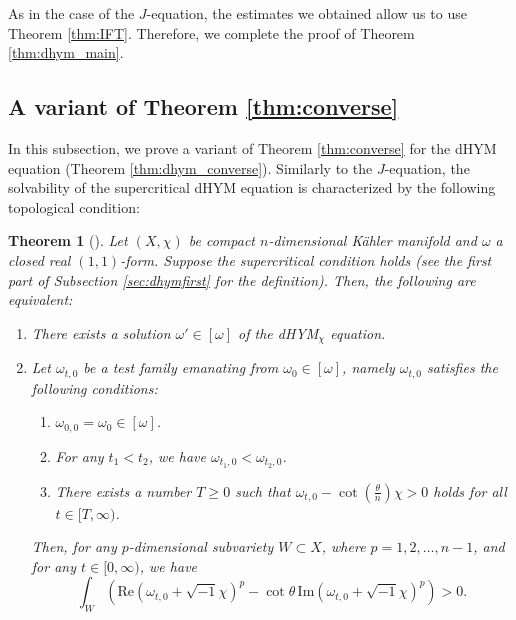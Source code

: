 \documentclass{amsart}
\numberwithin{equation}{section}
\theoremstyle{plain}
\newtheorem{theorem}[equation]{Theorem}
\theoremstyle{definition}
\theoremstyle{remark}
\begin{document}
As in the case of the $J$-equation, the estimates we obtained allow us to use Theorem \ref{thm:IFT}. Therefore, we complete the proof of Theorem \ref{thm:dhym_main}.

\subsection{A variant of Theorem \ref{thm:converse}}
In this subsection, we prove a variant of Theorem \ref{thm:converse} for the dHYM equation (Theorem \ref{thm:dhym_converse}).
Similarly to the $J$-equation, the solvability of the supercritical dHYM equation is characterized by the following topological condition:

\begin{theorem}[{\cite{G.Chen, CLT}}]\label{thm:CLT}
    Let $(X,\chi)$ be compact $n$-dimensional K{\"a}hler manifold and $\omega$ a closed real $(1,1)$-form. Suppose the supercritical condition holds (see the first part of Subsection \ref{sec:dhymfirst} for the definition). Then, the following are equivalent:
    \begin{enumerate}[font=\normalfont]
        \item There exists a solution $\omega'\in[\omega]$ of the dHYM$_\chi$ equation.
        \item Let $\omega_{t,0}$ be a test family emanating from $\omega_0\in[\omega]$, namely $\omega_{t,0}$ satisfies the following conditions:
        \begin{enumerate}[font=\normalfont]
            \item $\omega_{0,0}=\omega_0\in[\omega]$.
            \item For any $t_1<t_2$, we have $\omega_{t_1,0}<\omega_{t_2,0}$.
            \item There exists a number $T\ge0$ such that $\omega_{t,0}-\cot(\frac{\theta}{n})\chi>0$ holds for all $t\in[T,\infty)$.
        \end{enumerate}
        Then, for any $p$-dimensional subvariety $W\subset X$, where $p=1,2,\dots ,{n-1}$, and for any $t\in[0,\infty)$, we have
        $$\int_W\left(\mathrm{Re}(\omega_{t,0}+\sqrt{-1}\chi)^p-\cot\theta\, \mathrm{Im}(\omega_{t,0}+\sqrt{-1}\chi)^p\right)>0.$$
    \end{enumerate}
\end{theorem}
\end{document}
